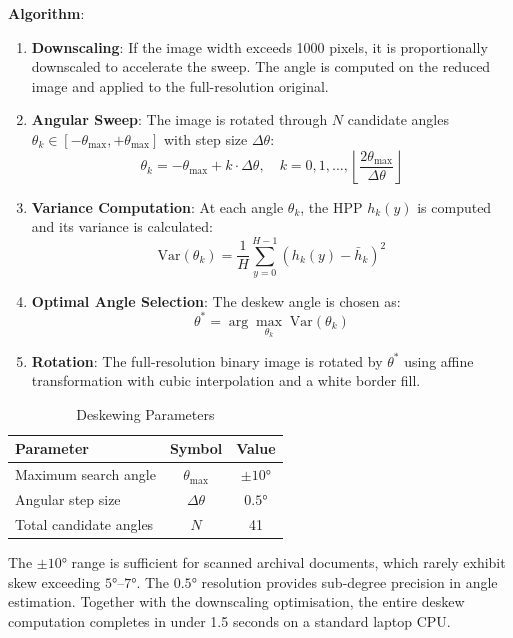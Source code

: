 \documentclass[12pt, a4paper]{article}
\begin{document}
\textbf{Algorithm}:
\begin{enumerate}
    \item \textbf{Downscaling}: If the image width exceeds 1000 pixels, it is proportionally downscaled to accelerate the sweep. The angle is computed on the reduced image and applied to the full-resolution original.
    \item \textbf{Angular Sweep}: The image is rotated through $N$ candidate angles $\theta_k \in [-\theta_{\max}, +\theta_{\max}]$ with step size $\Delta\theta$:
    \begin{equation}
        \theta_k = -\theta_{\max} + k \cdot \Delta\theta, \quad k = 0, 1, \ldots, \left\lfloor \frac{2\theta_{\max}}{\Delta\theta} \right\rfloor
    \end{equation}
    \item \textbf{Variance Computation}: At each angle $\theta_k$, the HPP $h_k(y)$ is computed and its variance is calculated:
    \begin{equation}
        \text{Var}(\theta_k) = \frac{1}{H} \sum_{y=0}^{H-1} \left( h_k(y) - \bar{h}_k \right)^2
    \end{equation}
    \item \textbf{Optimal Angle Selection}: The deskew angle is chosen as:
    \begin{equation}
        \theta^* = \arg\max_{\theta_k} \; \text{Var}(\theta_k)
        \label{eq:deskew}
    \end{equation}
    \item \textbf{Rotation}: The full-resolution binary image is rotated by $\theta^*$ using affine transformation with cubic interpolation and a white border fill.
\end{enumerate}

\begin{table}[H]
\centering
\caption{Deskewing Parameters}
\label{tab:deskew_params}
\begin{tabular}{@{}lcc@{}}
\toprule
\textbf{Parameter} & \textbf{Symbol} & \textbf{Value} \\
\midrule
Maximum search angle & $\theta_{\max}$ & $\pm 10°$ \\
Angular step size & $\Delta\theta$ & $0.5°$ \\
Total candidate angles & $N$ & 41 \\
\bottomrule
\end{tabular}
\end{table}

The $\pm 10°$ range is sufficient for scanned archival documents, which rarely exhibit skew exceeding $5°$--$7°$. The $0.5°$ resolution provides sub-degree precision in angle estimation. Together with the downscaling optimisation, the entire deskew computation completes in under 1.5 seconds on a standard laptop CPU.
\end{document}
